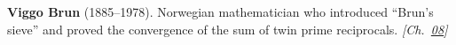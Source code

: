 \textbf{Viggo Brun} (1885–1978). Norwegian mathematician who introduced ``Brun's sieve'' and proved the convergence of the sum of twin prime reciprocals. \emph{[Ch.~\hyperref[ch:boundedprimegaps]{08}]}

